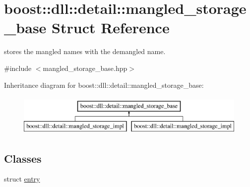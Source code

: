 \hypertarget{a01380}{}\section{boost\+:\+:dll\+:\+:detail\+:\+:mangled\+\_\+storage\+\_\+base Struct Reference}
\label{a01380}


stores the mangled names with the demangled name.  




{\ttfamily \#include $<$mangled\+\_\+storage\+\_\+base.\+hpp$>$}

Inheritance diagram for boost\+:\+:dll\+:\+:detail\+:\+:mangled\+\_\+storage\+\_\+base\+:\begin{figure}[H]
\begin{center}
\leavevmode
\includegraphics[height=2.000000cm]{a01380}
\end{center}
\end{figure}
\subsection*{Classes}
\begin{DoxyCompactItemize}
\item 
struct \hyperlink{a01384}{entry}
\end{DoxyCompactItemize}
